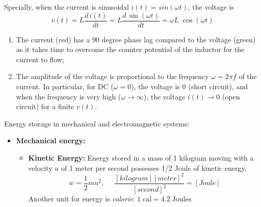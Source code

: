 \begin{itemize}
\begin{itemize}
  \begin{comment}
    The ratio between the primary voltage $V_1$ and the secondary voltage 
    $V_2$ of a transformer is proportional to the ratio between the numbers 
    of turns:
    \[
    \frac{V_2}{V_1}=\frac{n_2}{n_1}	
    \]
    If there is no power loss by the transformer, then the transformer is 
    ideal and we have
    \[
    P_1=V_1I_1=P_2=V_2I_2,\;\;\;\;\mbox{i.e.}\;\;\;\;
    \frac{I_2}{I_1}=\frac{V_1}{V_2}=\frac{n_1}{n_2}	
    \]
    The ratio between the primary current $I_1$ and the secondary current $I_2$ 
    of a transformer is inversely proportional to the ratio between the numbers
    of turns. Also note the reference directions of the currents $I_1$ and $I_2$
    and the reference polarities of the voltages $V_1$ and $V_2$, reflecting the
    fact that the secondary current $I_2$ is caused by the induced voltage $V_2$
    (consistent polarity), while $V_1$ is the induced voltage opposing the current
    $I_1$.

    We can also find the ratio between the primary and secondary impedances based 
    on the assumption that there is no power loss in the transformer, i.e.,
    \[	
    P_1=\frac{V_1^2}{R_1}=P_2=\frac{V_2^2}{R_2}, \;\;\;\;\;\;\;\;\;\;
    \frac{R_1}{R_2}=\left(\frac{V_1}{V_2}\right)^2=\left(\frac{n_1}{n_2}\right)^2  
    \]
  \end{comment}

  Specially, when the current is sinusoidal $i(t)=sin(\omega t)$, the 
  voltage is
  \[
  v(t)=L \frac{d\,i(t)}{dt} =L \frac{d\,\sin(\omega t)}{dt} 
  = \omega L\;\cos(\omega t)
  \]


  \begin{enumerate}
  \item The current (red) has a 90 degree phase lag compared to the 
    voltage (green) as it takes time to overcome the counter potential 
    of the inductor for the current to flow;
  \item The amplitude of the voltage is proportional to the frequency
    $\omega=2\pi f$ of the current. In particular, for DC ($\omega=0$), 
    the voltage is 0 (short circuit), and when the frequency is very 
    high ($\omega \rightarrow \infty$), the voltage $i(t) \rightarrow 0$
    (open circuit) for a finite $v(t)$.
  \end{enumerate}

  Energy storage in mechanical and electromagnetic systems:
  \begin{itemize}
  \item {\bf Mechanical energy:}
    \begin{itemize}
    \item {\bf Kinetic Energy:} Energy stored in a mass of 1 kilogram
      moving with a velocity $u$ of 1 meter per second possesses 1/2 Joule 
      of kinetic energy.
      \[	
      w=\frac{1}{2}mu^2,\;\;\;\;\;\frac{[kilogram][meter]^2}{[second]^2}=[Joule]
      \]
      Another unit for energy is {\em calorie}:
      $ 1 \; \mbox{cal}=4.2\;\mbox{Joules}	$
      

\end{itemize}
\end{itemize}
\end{itemize}
\end{itemize}
